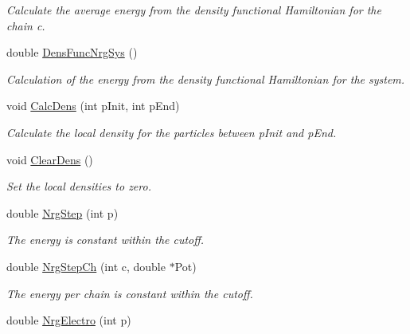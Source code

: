 \begin{DoxyCompactItemize}
\begin{DoxyCompactList}\small\item\em Calculate the average energy from the density functional Hamiltonian for the chain c. \end{DoxyCompactList}\item 
double \hyperlink{classForces_ad6b09c65169c95c3aff47220ad8327c6}{Dens\+Func\+Nrg\+Sys} ()\hypertarget{classForces_ad6b09c65169c95c3aff47220ad8327c6}{}\label{classForces_ad6b09c65169c95c3aff47220ad8327c6}

\begin{DoxyCompactList}\small\item\em Calculation of the energy from the density functional Hamiltonian for the system. \end{DoxyCompactList}\item 
void \hyperlink{classForces_af84f3585b204886f9166af82c0a229ac}{Calc\+Dens} (int p\+Init, int p\+End)\hypertarget{classForces_af84f3585b204886f9166af82c0a229ac}{}\label{classForces_af84f3585b204886f9166af82c0a229ac}

\begin{DoxyCompactList}\small\item\em Calculate the local density for the particles between p\+Init and p\+End. \end{DoxyCompactList}\item 
void \hyperlink{classForces_a0390d97ed1665851fb6175342d1c598b}{Clear\+Dens} ()\hypertarget{classForces_a0390d97ed1665851fb6175342d1c598b}{}\label{classForces_a0390d97ed1665851fb6175342d1c598b}

\begin{DoxyCompactList}\small\item\em Set the local densities to zero. \end{DoxyCompactList}\item 
double \hyperlink{classForces_aa0300c3611e3180e228fda26be216a09}{Nrg\+Step} (int p)
\begin{DoxyCompactList}\small\item\em The energy is constant within the cutoff. \end{DoxyCompactList}\item 
double \hyperlink{classForces_a65ed048334c9f52f87bd30a01b174739}{Nrg\+Step\+Ch} (int c, double $\ast$Pot)\hypertarget{classForces_a65ed048334c9f52f87bd30a01b174739}{}\label{classForces_a65ed048334c9f52f87bd30a01b174739}

\begin{DoxyCompactList}\small\item\em The energy per chain is constant within the cutoff. \end{DoxyCompactList}\item 
double \hyperlink{classForces_afc300be0d6cee6289a532bfa34cd551d}{Nrg\+Electro} (int p)\hypertarget{classForces_afc300be0d6cee6289a532bfa34cd551d}{}\label{classForces_afc300be0d6cee6289a532bfa34cd551d}


\end{DoxyCompactItemize}
